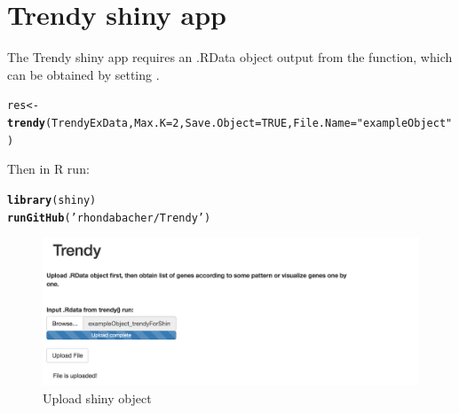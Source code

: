 \documentclass{article}\usepackage[]{graphicx}\usepackage[usenames,dvipsnames]{color}
\makeatletter
\newcommand{\hlnum}[1]{\textcolor[rgb]{0.686,0.059,0.569}{#1}}%
\newcommand{\hlstr}[1]{\textcolor[rgb]{0.192,0.494,0.8}{#1}}%
\newcommand{\hlstd}[1]{\textcolor[rgb]{0.345,0.345,0.345}{#1}}%
\newcommand{\hlkwb}[1]{\textcolor[rgb]{0.69,0.353,0.396}{#1}}%
\newcommand{\hlkwc}[1]{\textcolor[rgb]{0.333,0.667,0.333}{#1}}%
\newcommand{\hlkwd}[1]{\textcolor[rgb]{0.737,0.353,0.396}{\textbf{#1}}}%
\newenvironment{kframe}{%
 \def\at@end@of@kframe{}%
 \ifinner\ifhmode%
  \def\at@end@of@kframe{\end{minipage}}%
  \begin{minipage}{\columnwidth}%
 \fi\fi%
 \def\FrameCommand##1{\hskip\@totalleftmargin \hskip-\fboxsep
 \colorbox{shadecolor}{##1}\hskip-\fboxsep
     \hskip-\linewidth \hskip-\@totalleftmargin \hskip\columnwidth}%
 \MakeFramed {\advance\hsize-\width
   \@totalleftmargin\z@ \linewidth\hsize
   \@setminipage}}%
 {\par\unskip\endMakeFramed%
 \at@end@of@kframe}
\newenvironment{knitrout}{}{} %
\makeatother
\begin{document}
\section{Trendy shiny app}

The Trendy shiny app requires an .RData object output from the  function, which can be obtained by setting .

\begin{knitrout}
\color{fgcolor}\begin{kframe}
\begin{alltt}
\hlstd{res} \hlkwb{<-} \hlkwd{trendy}\hlstd{(TrendyExData,} \hlkwc{Max.K}\hlstd{=}\hlnum{2}\hlstd{,} \hlkwc{Save.Object} \hlstd{=} \hlnum{TRUE}\hlstd{,} \hlkwc{File.Name}\hlstd{=}\hlstr{"exampleObject"}\hlstd{)}
\end{alltt}
\end{kframe}
\end{knitrout}

Then in R run:
\begin{knitrout}
\color{fgcolor}\begin{kframe}
\begin{alltt}
\hlkwd{library}\hlstd{(shiny)}
\hlkwd{runGitHub}\hlstd{(}\hlstr{'rhondabacher/Trendy'}\hlstd{)}
\end{alltt}
\end{kframe}
\end{knitrout}

\begin{figure}[H]
\centering
\includegraphics[width=1\textwidth]{Shiny_UploadData.png}
\caption{Upload shiny object}
\end{figure}
\end{document}
